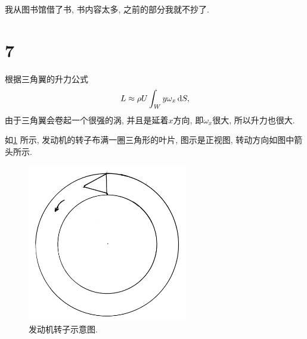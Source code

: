 \documentclass[12pt]{article}
\begin{document}
我从图书馆借了书, 书内容太多, 之前的部分我就不抄了. 



\section{7}

根据三角翼的升力公式
\begin{equation}
	L \approx \rho U \int_W y \omega_x \dif S,
\end{equation}
由于三角翼会卷起一个很强的涡, 并且是延着$x$方向, 即$\omega_x$很大, 所以升力也很大. 

如\cref{fig:7} 所示, 发动机的转子布满一圈三角形的叶片, 图示是正视图, 转动方向如图中箭头所示. 

\begin{figure}[htp]
	\centering
	\includegraphics[width=7cm]{7.jpeg}
	\caption{发动机转子示意图.}
	\label{fig:7}
\end{figure}



\nocite{*}


\end{document}
